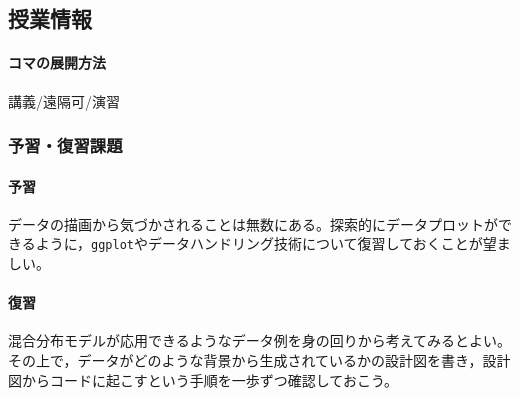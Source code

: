 \subsection{授業情報}
\paragraph{コマの展開方法}
講義/遠隔可/演習
\subsubsection{予習・復習課題}
\paragraph{予習}データの描画から気づかされることは無数にある。探索的にデータプロットができるように，\verb|ggplot|やデータハンドリング技術について復習しておくことが望ましい。
\paragraph{復習}混合分布モデルが応用できるようなデータ例を身の回りから考えてみるとよい。その上で，データがどのような背景から生成されているかの設計図を書き，設計図からコードに起こすという手順を一歩ずつ確認しておこう。